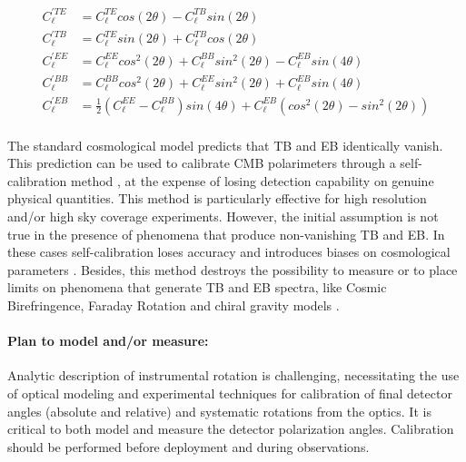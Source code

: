 \begin{equation}
\begin{split}
C_{\ell}^{\prime TE} &= C_{\ell}^{TE} cos(2\theta) - C_{\ell}^{TB} sin(2\theta)\\
C_{\ell}^{\prime TB} &= C_{\ell}^{TE} sin(2\theta) + C_{\ell}^{TB} cos(2\theta)\\
C_{\ell}^{\prime EE} &= C_{\ell}^{EE} cos^{2}(2\theta) + C_{\ell}^{BB} sin^{2}(2\theta) - C_{\ell}^{EB}sin(4\theta)\\
C_{\ell}^{\prime BB} &= C_{\ell}^{BB} cos^{2}(2\theta) + C_{\ell}^{EE} sin^{2}(2\theta) + C_{\ell}^{EB}sin(4\theta)\\
C_{\ell}^{\prime EB} &= \frac{1}{2} (C_{\ell}^{EE} - C_{\ell}^{BB}) sin(4\theta) + C_{\ell}^{EB}(cos^{2}(2\theta) - sin^{2}(2\theta))\\
\end{split}
\end{equation}

The standard cosmological model predicts that TB and EB identically vanish.
This prediction can be used to calibrate CMB polarimeters through a
self-calibration method \cite{keating13,kaufman14a}, at the expense of losing
detection capability on genuine physical quantities. This method is
particularly effective for high resolution and/or high sky coverage
experiments. However, the initial assumption is not true in the presence of
phenomena that produce non-vanishing TB and EB. In these cases self-calibration
loses accuracy and introduces biases on cosmological parameters
\cite{abitbol16}. 
Besides, this method destroys the possibility to measure or to place limits on
phenomena that generate TB and EB spectra, like Cosmic Birefringence, Faraday
Rotation and chiral gravity models \cite{kaufman14b,gerbino16}.


\paragraph{Plan to model and/or measure:}

Analytic description of instrumental rotation is challenging, necessitating the
use of optical modeling and experimental techniques for calibration of final
detector angles (absolute and relative) and systematic rotations from the
optics. It is critical to both model and measure the detector polarization angles.
Calibration should be performed before deployment and during observations. 

